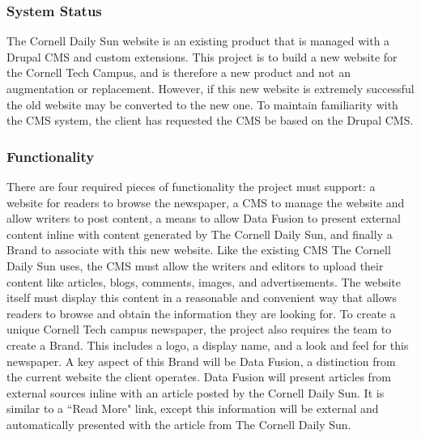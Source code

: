 \documentclass[12pt]{article} %
\begin{document}
\subsubsection{System Status}
                   
The Cornell Daily Sun website is an existing product that is managed with a Drupal CMS and custom extensions. This project is to build a new website for the Cornell Tech Campus, and is therefore a new product and not an augmentation or replacement. However, if this new website is extremely successful the old website may be converted to the new one. To maintain familiarity with the CMS system, the client has requested the CMS be based on the Drupal CMS.
                   
\subsubsection{Functionality}
                   
There are four required pieces of functionality the project must support: a website for readers to browse the newspaper, a CMS to manage the website and allow writers to post content, a means to allow Data Fusion to present external content inline with content generated by The Cornell Daily Sun, and finally a Brand to associate with this new website. Like the existing CMS The Cornell Daily Sun uses, the CMS must allow the writers and editors to upload their content like articles, blogs, comments, images, and advertisements. The website itself must display this content in a reasonable and convenient way that allows readers to browse and obtain the information they are looking for. To create a unique Cornell Tech campus newspaper, the project also requires the team to create a Brand. This includes a logo, a display name, and a look and feel for this newspaper. A key aspect of this Brand will be Data Fusion, a distinction from the current website the client operates. Data Fusion will present articles from external sources inline with an article posted by the Cornell Daily Sun. It is similar to a ``Read More" link, except this information will be external and automatically presented with the article from The Cornell Daily Sun.
                   
\end{document}
